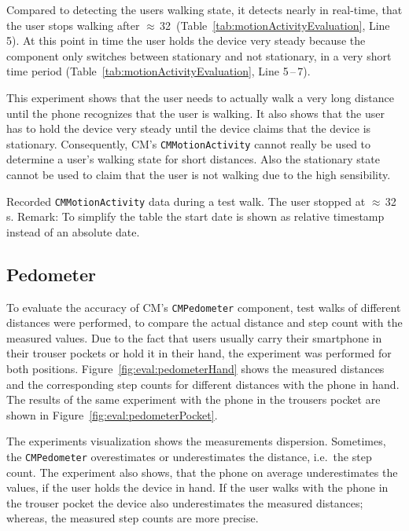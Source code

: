 Compared to detecting the users walking state, it detects nearly in real-time, that the user stops walking after $\approx$\,32\, (Table~\ref{tab:motionActivityEvaluation}, Line 5). At this point in time the user holds the device very steady because the component only switches between stationary and not stationary, in a very short time period (Table~\ref{tab:motionActivityEvaluation}, Line 5\,--\,7).

This experiment shows that the user needs to actually walk a very long distance until the phone recognizes that the user is walking. It also shows that the user has to hold the device very steady until the device claims that the device is stationary. Consequently, \ac{CM}'s \texttt{CMMotionActivity} cannot really be used to determine a user's walking state for short distances. Also the stationary state cannot be used to claim that the user is not walking due to the high sensibility.

\begin{table}
	
	\caption{Recorded \texttt{CMMotionActivity} data during a test walk. The user stopped at $\approx$\,32\,s. Remark: To simplify the table the start date is shown as relative timestamp instead of an absolute date.}
	\label{tab:motionActivityEvaluation}
\end{table}


\subsection{Pedometer}
To evaluate the accuracy of \ac{CM}'s \texttt{CMPedometer} component, test walks of different distances  were performed, to compare the actual distance and step count with the measured values. Due to the fact that users usually carry their smartphone in their trouser pockets or hold it in their hand, the experiment was performed for both positions. Figure~\ref{fig:eval:pedometerHand} shows the measured distances and the corresponding step counts for different distances with the phone in hand. The results of the same experiment with the phone in the trousers pocket are shown in Figure~\ref{fig:eval:pedometerPocket}.

The experiments visualization shows the measurements dispersion. Sometimes, the \texttt{CMPedometer} overestimates or underestimates the distance, i.e.\ the step count. The experiment also shows, that the phone on average underestimates the values, if the user holds the device in hand. If the user walks with the phone in the trouser pocket the device also underestimates the measured distances; whereas, the measured step counts are more precise.

